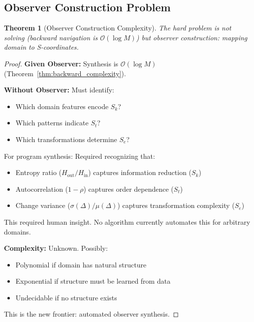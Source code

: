 \documentclass[twocolumn,10pt]{article}
\newtheorem{theorem}{Theorem}[section]
\theoremstyle{definition}
\theoremstyle{remark}
\newcommand{\Sk}{S_k}
\newcommand{\St}{S_t}
\newcommand{\Se}{S_e}
\newcommand{\bigO}{\mathcal{O}}
\begin{document}
\subsection{Observer Construction Problem}

\begin{theorem}[Observer Construction Complexity]
\label{thm:observer_construction}
The hard problem is not solving (backward navigation is $\bigO(\log M)$) but observer construction: mapping domain to S-coordinates.
\end{theorem}

\begin{proof}
\textbf{Given Observer:} Synthesis is $\bigO(\log M)$ (Theorem~\ref{thm:backward_complexity}).

\vspace{0.2cm}
\noindent\textbf{Without Observer:} Must identify:
\begin{itemize}
\item Which domain features encode $\Sk$?
\item Which patterns indicate $\St$?
\item Which transformations determine $\Se$?
\end{itemize}

For program synthesis: Required recognizing that:
\begin{itemize}
\item Entropy ratio ($H_{\text{out}}/H_{\text{in}}$) captures information reduction ($\Sk$)
\item Autocorrelation ($1-\rho$) captures order dependence ($\St$)
\item Change variance ($\sigma(\Delta)/\mu(\Delta)$) captures transformation complexity ($\Se$)
\end{itemize}

This required human insight. No algorithm currently automates this for arbitrary domains.

\vspace{0.2cm}
\noindent\textbf{Complexity:} Unknown. Possibly:
\begin{itemize}
\item Polynomial if domain has natural structure
\item Exponential if structure must be learned from data
\item Undecidable if no structure exists
\end{itemize}

This is the new frontier: automated observer synthesis.
\end{proof}
\end{document}

